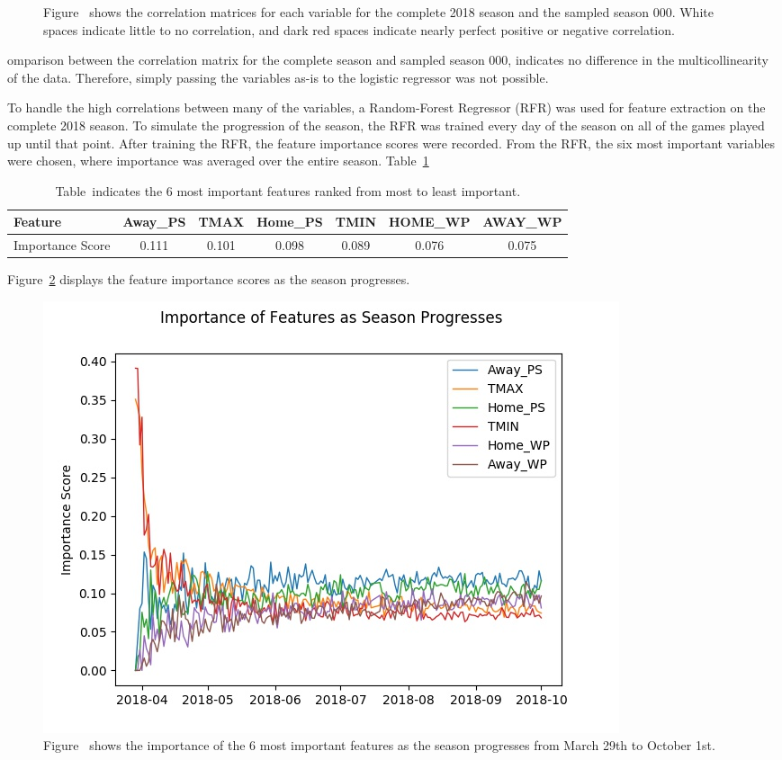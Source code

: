 \documentclass{article}
\begin{document}
\begin{figure}
    \caption{Figure~\label{Fig:Corr} shows the correlation matrices for each 
    variable for the complete 2018 season and the sampled season 000.
    White spaces indicate little to no 
    correlation, and dark red spaces indicate nearly perfect positive or 
    negative correlation.}
\end{figure}
omparison between the correlation matrix for the complete season and sampled
season 000,
indicates no difference in the multicollinearity of the data.
Therefore,
simply passing the variables as-is to the logistic regressor was not possible.
\par

To handle the high correlations between many of the variables,
a Random-Forest Regressor (RFR) was used for feature extraction on the complete
2018 season.
To simulate the progression of the season,
the RFR was trained every day of the season on all of the games played up
until that point.
After training the RFR,
the feature importance scores were recorded.
From the RFR,
the six most important variables were chosen, where importance was
averaged over the entire season.
Table~\ref{Tab:Importance}
\begin{table}[ht]
    \centering
    \begin{tabular}{l | c c c c c c}
        Feature &  Away\_PS & TMAX & Home\_PS & TMIN & HOME\_WP & AWAY\_WP \\
        \midrule
        Importance Score & 0.111 & 0.101 & 0.098 & 0.089 & 0.076 & 0.075 \\
    \end{tabular}
    \caption{Table~\label{Tab:Importance} indicates the 6 most important
features ranked from most to least important.}
\end{table}
Figure~\ref{Fig:RFR} displays the feature importance scores as the season
progresses.
\begin{figure}[ht]
    \centering
    \includegraphics[width=.8\textwidth]{feature-importance.jpg}
    \caption{Figure~\label{Fig:RFR} shows the importance of the 6 most 
    important features as the season progresses from March 29th to October 1st.}
\end{figure}
\end{document}

